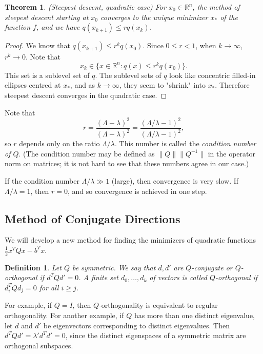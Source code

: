 \documentclass[11pt]{article}
\newcommand{\R}{\mathbb{R}}
\newtheorem{definition}{Definition}[subsection]
\newtheorem{theorem}{Theorem}[subsection]
\begin{document}
\begin{theorem}
(Steepest descent, quadratic case) For $x_0 \in \R^n$, the method of steepest descent starting at $x_0$ converges to the unique minimizer $x_*$ of the function $f$, and we have $q(x_{k+1}) \leq r q(x_k)$.
\end{theorem}
\begin{proof}
We know that $q(x_{k+1}) \leq r^k q(x_0)$. Since $0 \leq r < 1$, when $k \to \infty$, $r^k \to 0$. Note that
\[
x_k \in \{ x \in \R^n : q(x) \leq r^k q(x_0) \}.
\]
This set is a sublevel set of $q$. The sublevel sets of $q$ look like concentric filled-in ellipses centred at $x_*$, and as $k \to \infty$, they seem to "shrink" into $x_*$. Therefore steepest descent converges in the quadratic case.
\end{proof}

Note that
\[
r = \frac{(\Lambda - \lambda)^2}{(\Lambda - \lambda)^2} = \frac{( \Lambda / \lambda - 1 )^2}{(\Lambda / \lambda - 1)^2},
\]
so $r$ depends only on the ratio $\Lambda / \lambda$. This number is called the \emph{condition number of $Q$}. (The condition number may be defined as $\|Q\|\|Q^{-1}\|$ in the operator norm on matrices; it is not hard to see that these numbers agree in our case.) 

If the condition number $\Lambda / \lambda \gg 1$ (large), then convergence is very slow. If $\Lambda / \lambda = 1$, then $r = 0$, and so convergence is achieved in one step.

\subsection{Method of Conjugate Directions}

We will develop a new method for finding the minimizers of quadratic functions $\frac{1}{2}x^TQx - b^Tx$.

\begin{definition}
Let $Q$ be symmetric. We say that $d,d'$ are $Q$-conjugate or $Q$-orthogonal if $d^TQd' = 0$. A finite set $d_0, \dots, d_k$ of vectors is called $Q$-orthogonal if $d_i^TQd_j = 0$ for all $i \geq j$.
\end{definition}

For example, if $Q = I$, then $Q$-orthogonality is equivalent to regular orthogonality. For another example, if $Q$ has more than one distinct eigenvalue, let $d$ and $d'$ be eigenvectors corresponding to distinct eigenvalues. Then $d^TQd' = \lambda' d^Td' = 0$, since the distinct eigenspaces of a symmetric matrix are orthogonal subspaces.
\end{document}
